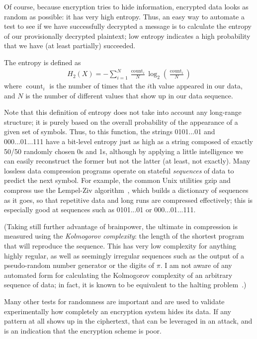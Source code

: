 \documentclass[%
 aip,
 jmp,%
 amsmath,amssymb,
 reprint,%
]{revtex4-1}
\begin{document}
Of course, because encryption tries to hide information, encrypted
data looks as random as possible: it has very high entropy.  Thus, an
easy way to automate a test to see if we have successfully decrypted a
message is to calculate the entropy of our provisionally decrypted
plaintext; low entropy indicates a high probability that we have (at
least partially) succeeded.

The entropy is defined as
\begin{align}
H_{2}(X)=-\sum_{i=1}^{N} \frac{\operatorname{count}_{i}}{N} \log
_{2}\left(\frac{\operatorname{count}_{i}}{N}\right)
\end{align}
where $\operatorname{count}_i$ is the number of times that the $i$th
value appeared in our data, and $N$ is the number of different values
that show up in our data sequence.

Note that this definition of entropy does not take into account any
long-range structure; it is purely based on the overall probability of
the appearance of a given set of symbols.  Thus, to this function, the
strings 0101...01 and 000...01...111 have a bit-level entropy just as
high as a string composed of exactly 50/50 randomly chosen 0s and 1s,
although by applying a little intelligence we can easily reconstruct
the former but not the latter (at least, not exactly).  Many lossless
data compression programs operate on stateful \emph{sequences} of data
to predict the next symbol.  For example, the common Unix utilities
gzip and compress use the Lempel-Ziv
algorithm~\cite{compression:Ziv78}, which builds a dictionary of
sequences as it goes, so that repetitive data and long runs are
compressed effectively; this is especially good at sequences such as
0101...01 or 000...01...111.

(Taking still further advantage of brainpower, the ultimate in
compression is measured using the \emph{Kolmogorov complexity}: the
length of the shortest program that will reproduce the sequence.  This
has very low complexity for anything highly regular, as well as
seemingly irregular sequences such as the output of a pseudo-random
number generator or the digits of $\pi$.  I am not aware of any
automated form for calculating the Kolmogorov complexity of an
arbitrary sequence of data; in fact, it is known to be equivalent to
the halting problem~\cite{chaitin1975theory,chaitin1995program}.)

Many other tests for randomness are important and are used to validate
experimentally how completely an encryption system hides its data.  If
any pattern at all shows up in the ciphertext, that can be leveraged
in an attack, and is an indication that the encryption scheme is
poor.
\end{document}
